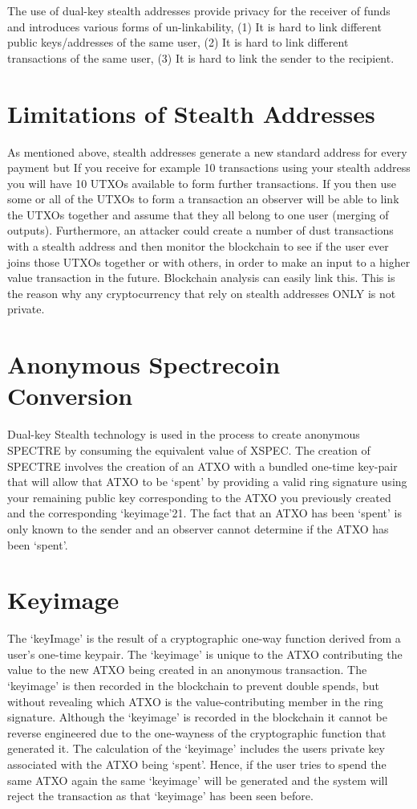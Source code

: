 The use of dual-key stealth addresses provide privacy for the receiver of
funds and introduces various forms of un-linkability, (1) It is hard to
link different public keys/addresses of the same user, (2) It is hard to
link different transactions of the same user, (3) It is hard to link the
sender to the recipient.


\section{Limitations of Stealth Addresses}
As mentioned above, stealth addresses generate a new standard address for
every payment but If you receive for example 10 transactions using your
stealth address you will have 10 UTXOs available to form further
transactions. If you then use some or all of the UTXOs to form a transaction
an observer will be able to link the UTXOs together and assume that they all
belong to one user (merging of outputs). Furthermore, an attacker could
create a number of dust transactions with a stealth address and then monitor
the blockchain to see if the user ever joins those UTXOs together or with
others, in order to make an input to a higher value transaction in the future.
Blockchain analysis can easily link this. This is the reason why any
cryptocurrency that rely on stealth addresses ONLY is not private.



\section{Anonymous Spectrecoin Conversion}
Dual-key Stealth technology is used in the process to create anonymous SPECTRE
by consuming the equivalent value of XSPEC. The creation of SPECTRE involves
the creation of an ATXO with a bundled one-time key-pair that will allow that
ATXO to be ‘spent’ by providing a valid ring signature using your remaining
public key corresponding to the ATXO you previously created and the
corresponding ‘keyimage’21. The fact that an ATXO has been ‘spent’ is only
known to the sender and an observer cannot determine if the ATXO has been
‘spent’.



\section{Keyimage}
The ‘keyImage’ is the result of a cryptographic one-way function derived
from a user’s one-time keypair. The ‘keyimage’ is unique to the ATXO
contributing the value to the new ATXO being created in an anonymous
transaction. The ‘keyimage’ is then recorded in the blockchain to prevent
double spends, but without revealing which ATXO is the value-contributing
member in the ring signature. Although the ‘keyimage’ is recorded in the
blockchain it cannot be reverse engineered due to the one-wayness of the
cryptographic function that generated it. The calculation of the ‘keyimage’
includes the users private key associated with the ATXO being ‘spent’.
Hence, if the user tries to spend the same ATXO again the same ‘keyimage’
will be generated and the system will reject the transaction as that
‘keyimage’ has been seen before.



